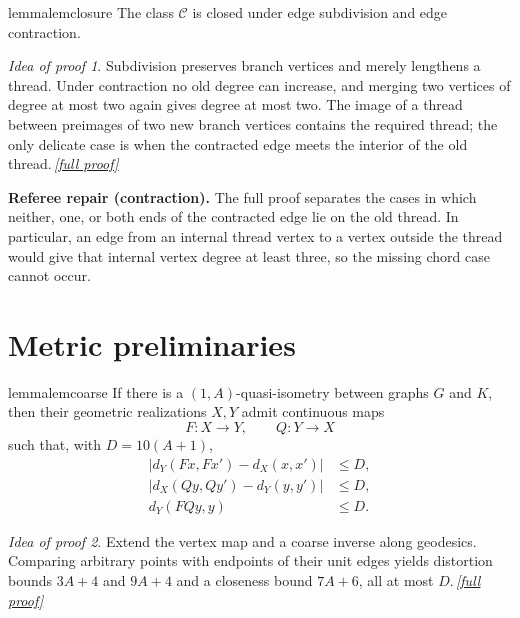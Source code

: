 \documentclass[11pt,a4paper]{article}
\theoremstyle{plain}
\theoremstyle{definition}
\theoremstyle{remark}
\newtheorem*{proofidea}{Idea of proof}
\newcommand{\fullproofref}[1]{\,\hyperref[#1]{\textit{[full proof]}}}
\newcommand{\cC}{\mathcal C}
\begin{document}
\begin{restatable}{lemma}{lemclosure}\label{lem:closure}
The class $\cC$ is closed under edge subdivision and edge contraction.
\end{restatable}
\begin{proofidea}
Subdivision preserves branch vertices and merely lengthens a thread. Under contraction no old degree can increase, and merging two vertices of degree at most two again gives degree at most two. The image of a thread between preimages of two new branch vertices contains the required thread; the only delicate case is when the contracted edge meets the interior of the old thread.\fullproofref{pf:closure}
\end{proofidea}

\begin{repairbox}
\textbf{Referee repair (contraction).} The full proof separates the cases in which neither, one, or both ends of the contracted edge lie on the old thread. In particular, an edge from an internal thread vertex to a vertex outside the thread would give that internal vertex degree at least three, so the missing chord case cannot occur.
\end{repairbox}

\section{Metric preliminaries}\label{sec:metric}

\begin{restatable}{lemma}{lemcoarse}\label{lem:coarse}
If there is a $(1,A)$-quasi-isometry between graphs $G$ and $K$, then their geometric realizations $X,Y$ admit continuous maps
\[
 F\colon X\to Y,\qquad Q\colon Y\to X
\]
such that, with $D=10(A+1)$,
\[
\begin{aligned}
 |d_Y(Fx,Fx')-d_X(x,x')|&\le D,\\
 |d_X(Qy,Qy')-d_Y(y,y')|&\le D,\\
 d_Y(FQy,y)&\le D.
\end{aligned}
\tag{3.1}\label{eq:coarse-inverse-bounds}
\]
\end{restatable}
\begin{proofidea}
Extend the vertex map and a coarse inverse along geodesics. Comparing arbitrary points with endpoints of their unit edges yields distortion bounds $3A+4$ and $9A+4$ and a closeness bound $7A+6$, all at most $D$.\fullproofref{pf:coarse}
\end{proofidea}
\end{document}
